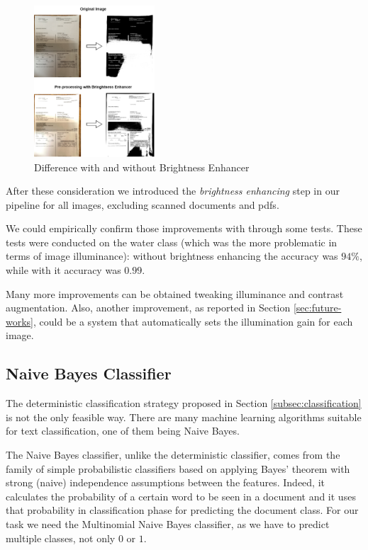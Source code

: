 \documentclass[10pt,twocolumn,letterpaper]{article}
\begin{document}
\begin{figure}[!ht]
  \centering
  \includegraphics[width=0.4\textwidth]{images/bright-contrast-experiment.png}
  \caption{Difference with and without Brightness Enhancer}
  \label{bright-constrast-experiment}
\end{figure}

After these consideration we introduced the \emph{brightness
  enhancing} step in our pipeline for all images, excluding scanned
documents and pdfs.

We could empirically confirm those improvements with through some
tests. These tests were conducted on the water class (which was the
more problematic in terms of image illuminance): without brightness
enhancing the accuracy was $94\%$, while with it accuracy was $0.99$.

Many more improvements can be obtained tweaking illuminance and
contrast augmentation. Also, another improvement, as reported in
Section \ref{sec:future-works}, could be a system that automatically
sets the illumination gain for each image.

\subsection{Naive Bayes Classifier}
\label{subsec:naive-bayes-classifier}

The deterministic classification strategy proposed in Section
\ref{subsec:classification} is not the only feasible way. There are
many machine learning algorithms suitable for text classification,
one of them being Naive Bayes.

The Naive Bayes classifier, unlike the deterministic classifier, comes
from the family of simple probabilistic classifiers based on applying
Bayes' theorem with strong (naive) independence assumptions between
the features. Indeed, it calculates the probability of a certain word
to be seen in a document and it uses that probability in
classification phase for predicting the document class. For our task
we need the Multinomial Naive Bayes classifier, as we have to predict
multiple classes, not only $0$ or $1$.
\end{document}
